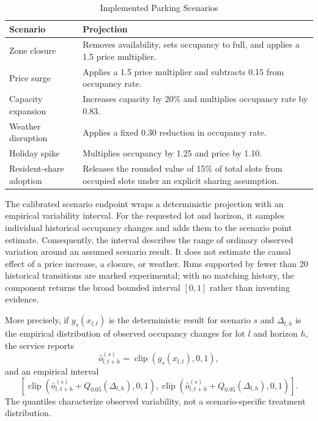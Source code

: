 \documentclass[conference]{IEEEtran}
\begin{document}
\begin{table}[!t]
\caption{Implemented Parking Scenarios}
\label{tab:scenarios}
\centering
\footnotesize
\begin{tabular}{p{}p{}}
\hline
\textbf{Scenario} & \textbf{Projection} \\
\hline
Zone closure & Removes availability, sets occupancy to full, and applies a 1.5 price multiplier. \\
Price surge & Applies a 1.5 price multiplier and subtracts 0.15 from occupancy rate. \\
Capacity expansion & Increases capacity by 20\% and multiplies occupancy rate by 0.83. \\
Weather disruption & Applies a fixed 0.30 reduction in occupancy rate. \\
Holiday spike & Multiplies occupancy by 1.25 and price by 1.10. \\
Resident-share adoption & Releases the rounded value of 15\% of total slots from occupied slots under an explicit sharing assumption. \\
\hline
\end{tabular}
\end{table}

The calibrated scenario endpoint wraps a deterministic projection with an empirical variability interval. For the requested lot and horizon, it samples individual historical occupancy changes and adds them to the scenario point estimate. Consequently, the interval describes the range of ordinary observed variation around an assumed scenario result. It does not estimate the causal effect of a price increase, a closure, or weather. Runs supported by fewer than 20 historical transitions are marked experimental; with no matching history, the component returns the broad bounded interval $[0,1]$ rather than inventing evidence.

More precisely, if $g_s(x_{l,t})$ is the deterministic result for scenario $s$ and $\Delta_{l,h}$ is the empirical distribution of observed occupancy changes for lot $l$ and horizon $h$, the service reports
\begin{equation}
\hat{o}^{(s)}_{l,t+h}=\operatorname{clip}(g_s(x_{l,t}),0,1),
\label{eq:scenario}
\end{equation}
and an empirical interval
\begin{equation}
\left[\operatorname{clip}(\hat{o}^{(s)}_{l,t+h}+Q_{0.05}(\Delta_{l,h}),0,1),
\operatorname{clip}(\hat{o}^{(s)}_{l,t+h}+Q_{0.95}(\Delta_{l,h}),0,1)\right].
\label{eq:scenariointerval}
\end{equation}
The quantiles characterize observed variability, not a scenario-specific treatment distribution.
\end{document}
